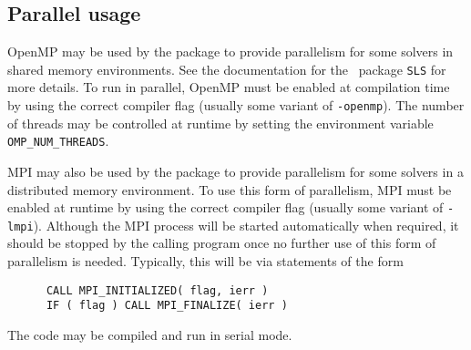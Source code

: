 
\subsection{Parallel usage}
OpenMP may be used by the {\tt \fullpackagename} package to provide
parallelism for some solvers in shared memory environments.
See the documentation for the \galahad\ package {\tt SLS} for more details.
To run in parallel, OpenMP
must be enabled at compilation time by using the correct compiler flag
(usually some variant of {\tt -openmp}).
The number of threads may be controlled at runtime
by setting the environment variable {\tt OMP\_NUM\_THREADS}.

\noindent
MPI may also be used by the package to provide
parallelism for some solvers in a distributed memory environment.
To use this form of parallelism, MPI must be enabled at runtime 
by using the correct compiler flag
(usually some variant of {\tt -lmpi}).
Although the MPI process will be started automatically when required,
it should be stopped by the calling program once no further use of
this form of parallelism is needed. Typically, this will be via
statements of the form
\begin{verbatim}
      CALL MPI_INITIALIZED( flag, ierr )
      IF ( flag ) CALL MPI_FINALIZE( ierr )
\end{verbatim}

\noindent
The code may be compiled and run in serial mode.
